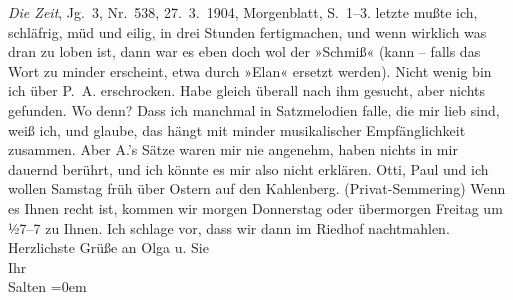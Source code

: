 \begin{ledgroupsized}[t]{13cm}
{{{                     \emph{Die Zeit}, Jg. 3, Nr. 538, 27. 3. 1904, Morgenblatt, S. 1–3.}}}\label{K_L03394-1h} letzte mußte ich, schläfrig, müd und eilig, in
               drei Stunden fertigmachen, und wenn wirklich was dran zu loben ist, dann war es eben
               doch wol der »Schmiß« (kann – falls das Wort zu minder erscheint, etwa durch »Elan«
               ersetzt werden). Nicht wenig bin ich über P. A.
               erschrocken. Habe gleich überall nach ihm gesucht, aber nichts gefunden. Wo denn?
               Dass ich manchmal in Satzmelodien falle, die mir lieb sind, weiß ich, und glaube, das
               hängt mit minder musikalischer Empfänglichkeit zusammen. Aber A.’s Sätze waren mir nie angenehm, haben nichts in mir dauernd
               berührt, und ich könnte es mir also nicht erklären. \pend
           \pstart
           Otti, Paul und ich wollen Samstag früh über Ostern auf den Kahlenberg. (Privat-Semmering) Wenn es Ihnen recht ist, kommen wir morgen
                  Donnerstag oder übermorgen Freitag um ½7–7
               zu Ihnen. Ich schlage vor, dass wir dann im Riedhof
               nachtmahlen. \pend
           \pstart
           Herzlichste Grüße an Olga u. Sie {\\[\baselineskip]}Ihr {\\[\baselineskip]}\spacefill\mbox{Salten}\pend
           \leftskip=0em{}
         
         \endnumbering{}\end{ledgroupsized}\begin{anhang}\end{anhang}\newcommand{\dateiname}{L03394}\newcommand{\titel}{Felix Salten an Arthur Schnitzler, 30. 3. 1904}\newcommand{\editorInnen}{Martin Anton Müller und Laura Untner}
      